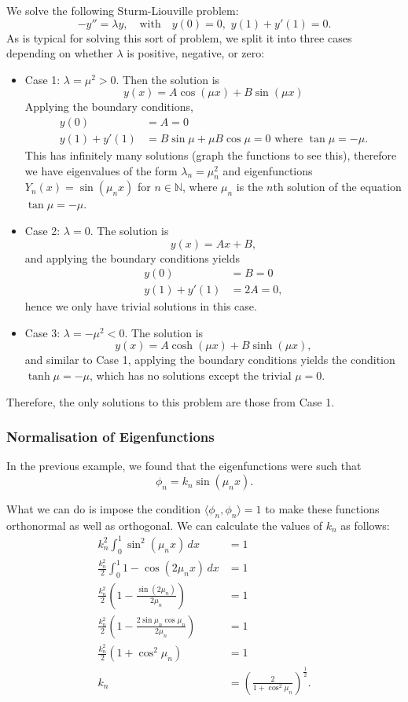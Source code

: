 \begin{eg}
	We solve the following Sturm-Liouville problem:
	\[
	-y'' = \lambda y, \quad\text{with}\quad y(0)=0,\,\, y(1) + y'(1) = 0.
	\]
	As is typical for solving this sort of problem, we split it into three cases depending on whether $\lambda$ is positive, negative, or zero:
	\begin{itemize}
		\item Case 1: $\lambda = \mu^2 > 0$. Then the solution is
		\[
		y(x) = A\cos(\mu x) + B\sin(\mu x)
		\]
		Applying the boundary conditions,
		\begin{align*}
			y(0) &= A = 0 \\
			y(1) + y'(1) &= B\sin\mu + \mu B\cos\mu = 0 \text{ where } \tan\mu = -\mu.
		\end{align*}
		This has infinitely many solutions (graph the functions to see this), therefore we have eigenvalues of the form $\lambda_n = \mu_n^2$ and eigenfunctions $Y_n(x) = \sin(\mu_n x)$ for $n \in \mathbb{N}$, where $\mu_n$ is the $n$th solution of the equation $\tan\mu = -\mu$.
		
		\item Case 2: $\lambda = 0$. The solution is
		\[
		y(x) = Ax + B,
		\]
		and applying the boundary conditions yields
		\begin{align*}
			y(0) &= B = 0 \\
			y(1) + y'(1) &= 2A = 0,
		\end{align*}
		hence we only have trivial solutions in this case.
		
		\item Case 3: $\lambda = -\mu^2 < 0$. The solution is
		\[
		y(x) = A\cosh(\mu x) + B\sinh(\mu x),
		\]
		and similar to Case 1, applying the boundary conditions yields the condition $\tanh\mu = -\mu$, which has no solutions except the trivial $\mu = 0$.
	\end{itemize}
	Therefore, the only solutions to this problem are those from Case 1.
\end{eg}

\subsubsection{Normalisation of Eigenfunctions}

In the previous example, we found that the eigenfunctions were such that
\[
\phi_n = k_n \sin(\mu_nx).
\]

What we can do is impose the condition $\langle \phi_n, \phi_n \rangle = 1$ to make these functions orthonormal as well as orthogonal. We can calculate the values of $k_n$ as follows:
\begin{align*}
	k_n^2 \int_0^1 \sin^2(\mu_n x) \,dx &= 1 \\
	\frac{k_n^2}{2} \int_0^1 1 - \cos(2\mu_nx) \,dx &= 1 \\
	\frac{k_n^2}{2} \left(1 - \frac{\sin(2\mu_n)}{2\mu_n}\right) &= 1 \\
	\frac{k_n^2}{2} \left(1 - \frac{2\sin\mu_n\cos\mu_n}{2\mu_n}\right) &= 1 \\
	\frac{k_n^2}{2} (1 + \cos^2\mu_n) &= 1 \\
	k_n &= \left(\frac{2}{1 + \cos^2\mu_n}\right)^{\frac12}.
\end{align*}


